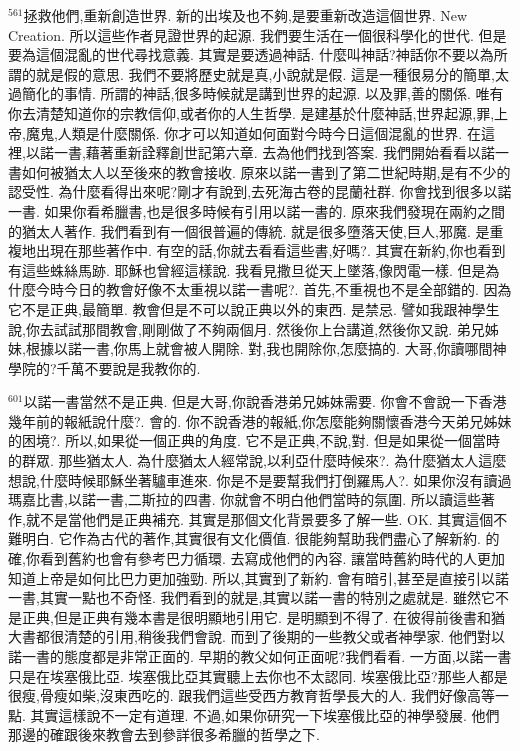 \documentclass{book}
\begin{document}
$^{561}$拯救他們,重新創造世界.
新的出埃及也不夠,是要重新改造這個世界.
New Creation.
所以這些作者見證世界的起源.
我們要生活在一個很科學化的世代.
但是要為這個混亂的世代尋找意義.
其實是要透過神話.
什麼叫神話?神話你不要以為所謂的就是假的意思.
我們不要將歷史就是真,小說就是假.
這是一種很易分的簡單,太過簡化的事情.
所謂的神話,很多時候就是講到世界的起源.
以及罪,善的關係.
唯有你去清楚知道你的宗教信仰,或者你的人生哲學.
是建基於什麼神話,世界起源,罪,上帝,魔鬼,人類是什麼關係.
你才可以知道如何面對今時今日這個混亂的世界.
在這裡,以諾一書,藉著重新詮釋創世記第六章.
去為他們找到答案.
我們開始看看以諾一書如何被猶太人以至後來的教會接收.
原來以諾一書到了第二世紀時期,是有不少的認受性.
為什麼看得出來呢?剛才有說到,去死海古卷的昆蘭社群.
你會找到很多以諾一書.
如果你看希臘書,也是很多時候有引用以諾一書的.
原來我們發現在兩約之間的猶太人著作.
我們看到有一個很普遍的傳統.
就是很多墮落天使,巨人,邪魔.
是重複地出現在那些著作中.
有空的話,你就去看看這些書,好嗎?.
其實在新約,你也看到有這些蛛絲馬跡.
耶穌也曾經這樣說.
我看見撒旦從天上墜落,像閃電一樣.
但是為什麼今時今日的教會好像不太重視以諾一書呢?.
首先,不重視也不是全部錯的.
因為它不是正典,最簡單.
教會但是不可以說正典以外的東西.
是禁忌.
譬如我跟神學生說,你去試試那間教會,剛剛做了不夠兩個月.
然後你上台講道,然後你又說.
弟兄姊妹,根據以諾一書,你馬上就會被人開除.
對,我也開除你,怎麼搞的.
大哥,你讀哪間神學院的?千萬不要說是我教你的.

$^{601}$以諾一書當然不是正典.
但是大哥,你說香港弟兄姊妹需要.
你會不會說一下香港幾年前的報紙說什麼?.
會的.
你不說香港的報紙,你怎麼能夠關懷香港今天弟兄姊妹的困境?.
所以,如果從一個正典的角度.
它不是正典,不說,對.
但是如果從一個當時的群眾.
那些猶太人.
為什麼猶太人經常說,以利亞什麼時候來?.
為什麼猶太人這麼想說,什麼時候耶穌坐著驢車進來.
你是不是要幫我們打倒羅馬人?.
如果你沒有讀過瑪嘉比書,以諾一書,二斯拉的四書.
你就會不明白他們當時的氛圍.
所以讀這些著作,就不是當他們是正典補充.
其實是那個文化背景要多了解一些.
OK.
其實這個不難明白.
它作為古代的著作,其實很有文化價值.
很能夠幫助我們盡心了解新約.
的確,你看到舊約也會有參考巴力循環.
去寫成他們的內容.
讓當時舊約時代的人更加知道上帝是如何比巴力更加強勁.
所以,其實到了新約.
會有暗引,甚至是直接引以諾一書,其實一點也不奇怪.
我們看到的就是,其實以諾一書的特別之處就是.
雖然它不是正典,但是正典有幾本書是很明顯地引用它.
是明顯到不得了.
在彼得前後書和猶大書都很清楚的引用,稍後我們會說.
而到了後期的一些教父或者神學家.
他們對以諾一書的態度都是非常正面的.
早期的教父如何正面呢?我們看看.
一方面,以諾一書只是在埃塞俄比亞.
埃塞俄比亞其實聽上去你也不太認同.
埃塞俄比亞?那些人都是很瘦,骨瘦如柴,沒東西吃的.
跟我們這些受西方教育哲學長大的人.
我們好像高等一點.
其實這樣說不一定有道理.
不過,如果你研究一下埃塞俄比亞的神學發展.
他們那邊的確跟後來教會去到參詳很多希臘的哲學之下.
\end{document}
